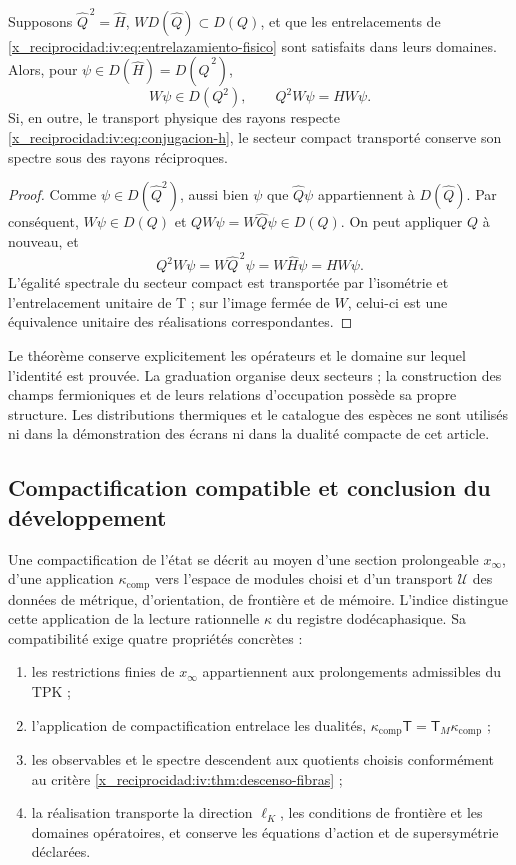 \begin{theorem}
\label{x_reciprocidad:iv:thm:supercarga-transporte}
Supposons \(\widehat Q^{\,2}=\widehat H\),
\(W D(\widehat Q)\subset D(Q)\), et que les
entrelacements de \eqref{x_reciprocidad:iv:eq:entrelazamiento-fisico}
sont satisfaits dans leurs domaines. Alors, pour
\(\psi\in D(\widehat H)=D(\widehat Q^{\,2})\),
\[
 W\psi\in D(Q^2),\qquad Q^2W\psi=HW\psi.
\]
Si, en outre, le transport physique des rayons respecte
\eqref{x_reciprocidad:iv:eq:conjugacion-h}, le secteur compact
transporté conserve son spectre sous des rayons réciproques.
\end{theorem}
\begin{proof}
Comme \(\psi\in D(\widehat Q^2)\), aussi bien
\(\psi\) que \(\widehat Q\psi\) appartiennent
à \(D(\widehat Q)\). Par conséquent, \(W\psi\in D(Q)\)
et \(QW\psi=W\widehat Q\psi\in D(Q)\). On peut
appliquer \(Q\) à nouveau, et
\[
 Q^2W\psi=W\widehat Q^{\,2}\psi
          =W\widehat H\psi=HW\psi.
\]
L’égalité spectrale du secteur compact est transportée
par l’isométrie et l’entrelacement unitaire de T ;
sur l’image fermée de \(W\), celui-ci est une
équivalence unitaire des réalisations correspondantes.
\end{proof}

Le théorème conserve explicitement les opérateurs et le
domaine sur lequel l’identité est prouvée. La
graduation organise deux secteurs ; la construction des
champs fermioniques et de leurs relations d’occupation possède
sa propre structure. Les distributions thermiques et le
catalogue des espèces ne sont utilisés ni dans la démonstration
des écrans ni dans la dualité compacte de cet
article.

\subsection{Compactification compatible et conclusion du développement}

Une compactification de l’état se décrit au moyen
d’une section prolongeable \(x_\infty\), d’une application
\(\kappa_{\mathrm{comp}}\) vers l’espace de modules
choisi et d’un transport \(\mathcal U\) des données
de métrique, d’orientation, de frontière et de mémoire. L’indice
distingue cette application de la lecture rationnelle
\(\kappa\) du registre dodécaphasique. Sa compatibilité
exige quatre propriétés concrètes :
\begin{enumerate}
\item les restrictions finies de \(x_\infty\)
      appartiennent aux prolongements admissibles du TPK ;
\item l’application de compactification entrelace les dualités,
      \(\kappa_{\mathrm{comp}}\mathsf T
        =\mathsf T_M\kappa_{\mathrm{comp}}\) ;
\item les observables et le spectre descendent aux
      quotients choisis conformément au critère
      \ref{x_reciprocidad:iv:thm:descenso-fibras} ;
\item la réalisation transporte la direction
      \(\ell_K\), les conditions de frontière et les
      domaines opératoires, et conserve les équations
      d’action et de supersymétrie déclarées.
\end{enumerate}

